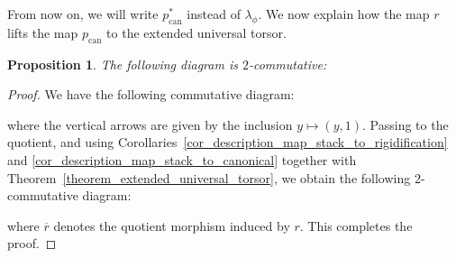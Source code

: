\documentclass{proc-l}
\newcommand{\I}{\mathcal{I}}
\newcommand{\G}{\mathbf{G}}
\DeclareMathOperator{\can}{can}
\DeclareMathOperator{\NS}{NS}
\DeclareMathOperator{\orb}{orb}
\DeclareMathOperator{\ext}{ext}
\newcommand{\stackT}{\mathcal{T}}
\newcommand{\sheafI}{\mathcal{I}}
\newcommand{\twistsector}{\pi_0^*(\sheafI_{\mu} X)}
\newtheorem{prop}[theorem]{Proposition}
\theoremstyle{definition}
\theoremstyle{remark}
\numberwithin{equation}{section}
\begin{document}
From now on, we will write $p_{\can}^*$ instead of $\lambda_{\phi}$. We now explain how the map $r$ lifts the map $p_{\can}$ to the extended universal torsor.

\begin{prop}\label{proposition_lift_of_canonical_map_to_extended_univ_torsor}
The following diagram is $2$-commutative:
\begin{center}
\end{center}
\end{prop}

\begin{proof}
We have the following commutative diagram:
\begin{center}
\end{center}
where the vertical arrows are given by the inclusion $y \mapsto (y,1)$. Passing to the quotient, and using Corollaries~\ref{cor_description_map_stack_to_rigidification} and
\ref{cor_description_map_stack_to_canonical} together with Theorem~\ref{theorem_extended_universal_torsor}, we obtain the following $2$-commutative diagram:
\begin{center}
\end{center}
where $\overline r$ denotes the quotient morphism induced by $r$. This completes the proof.
\end{proof}
\end{document}
